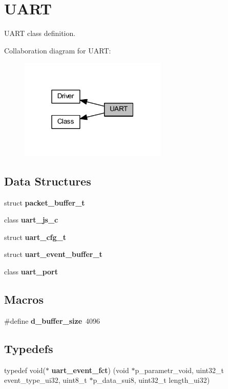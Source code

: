 \section{U\+A\+RT}
\label{group___u_a_r_t}


U\+A\+RT class definition.  


Collaboration diagram for U\+A\+RT\+:\nopagebreak
\begin{figure}[H]
\begin{center}
\leavevmode
\includegraphics[width=199pt]{group___u_a_r_t}
\end{center}
\end{figure}
\subsection*{Data Structures}
\begin{DoxyCompactItemize}
\item 
struct \textbf{ packet\+\_\+buffer\+\_\+t}
\item 
class \textbf{ uart\+\_\+js\+\_\+c}
\item 
struct \textbf{ uart\+\_\+cfg\+\_\+t}
\item 
struct \textbf{ uart\+\_\+event\+\_\+buffer\+\_\+t}
\item 
class \textbf{ uart\+\_\+port}
\end{DoxyCompactItemize}
\subsection*{Macros}
\begin{DoxyCompactItemize}
\item 
\#define \textbf{ d\+\_\+buffer\+\_\+size}~4096
\end{DoxyCompactItemize}
\subsection*{Typedefs}
\begin{DoxyCompactItemize}
\item 
typedef void($\ast$ \textbf{ uart\+\_\+event\+\_\+fct}) (void $\ast$p\+\_\+parametr\+\_\+void, uint32\+\_\+t event\+\_\+type\+\_\+ui32, uint8\+\_\+t $\ast$p\+\_\+data\+\_\+sui8, uint32\+\_\+t length\+\_\+ui32)
\end{DoxyCompactItemize}

